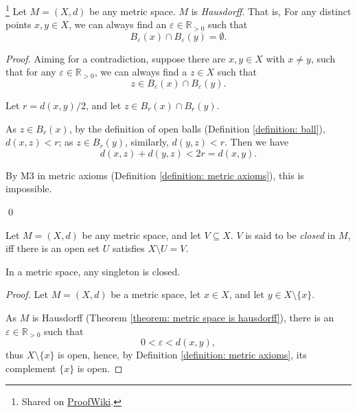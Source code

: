 \begin{theorem}
	\label{theorem: metric space is hausdorff}
	
	\footnote{
		Shared on \href{https://proofwiki.org/wiki/Metric_Space_is_Hausdorff}{ProofWiki}.
	}
	Let $M = (X, d)$ be any metric space. $M$ is \textit{Hausdorff}. That is, For any distinct points $x,y \in X$, we can always find an $\varepsilon \in \mathbb R_{> 0}$ such that
	$$
	B_\varepsilon(x) \cap B_\varepsilon(y) = \emptyset.
	$$
	
	\begin{proof}
		Aiming for a contradiction, suppose there are $x,y \in X$ with $x \ne y$, such that for any $\varepsilon \in \mathbb R_{> 0}$, we can always find a $z \in X$ such that
		$$
		z \in B_\varepsilon(x) \cap B_\varepsilon(y).
		$$
		
		Let $r = d(x,y)/2$, and let $z \in B_r(x) \cap B_r(y)$.
		
		As $z \in B_r(x)$, by the definition of open balls (Definition \ref{definition: ball}), $d(x,z) < r$; as $z \in B_r(y)$, similarly, $d(y,z)< r$. Then we have
		$$
		d(x, z) + d(y, z) < 2r = d(x,y).
		$$
		
		By M3 in metric axioms (Definition \ref{definition: metric axioms}), this is impossible.
		
		\qed
	\end{proof}
\end{theorem}


\begin{definition}
	\label{definition: closed set in metric space}
	Let $M = (X, d)$ be any metric space, and let $V \subseteq X$. $V$ is said to be \textit{closed} in $M$, iff there is an open set $U$ satisfies $X \setminus U = V$.
\end{definition}


\begin{lemma}
	\label{lemma: singleton in metric space is closed}
	In a metric space, any singleton is closed.
	
	\begin{proof}
		Let $M=(X, d)$ be a metric space, let $x \in X$, and let $y \in X \setminus \{x\}$.
		
		As $M$ is Hausdorff (Theorem \ref{theorem: metric space is hausdorff}), there is an $\varepsilon \in \mathbb R_{> 0}$ such that
		$$
		0 < \varepsilon < d(x,y),
		$$
		thus $X \setminus \{x\}$ is open, hence, by Definition \ref{definition: metric axioms}, its complement $\{x\}$ is open.
		
		\qedlemma
	\end{proof}
\end{lemma}


